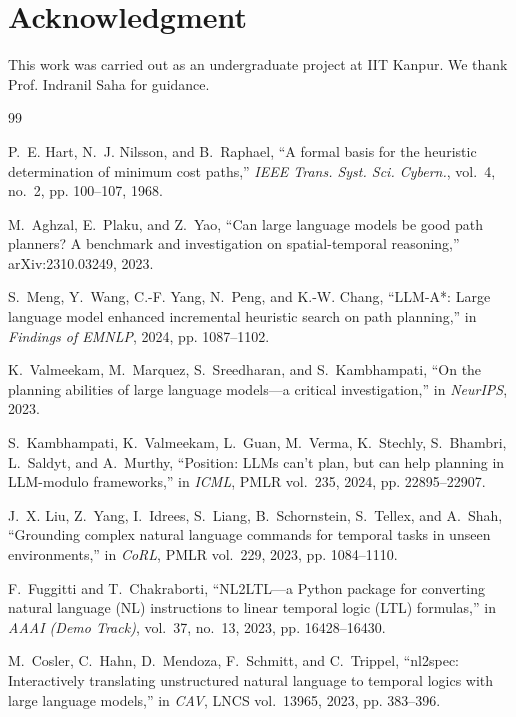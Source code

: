 \documentclass[letterpaper, 10 pt, conference]{ieeeconf}
\begin{document}
\section*{Acknowledgment}
This work was carried out as an undergraduate project at IIT Kanpur. We thank Prof. Indranil Saha for guidance.

\begin{thebibliography}{99}
\footnotesize

P.~E. Hart, N.~J. Nilsson, and B.~Raphael, ``A formal basis for the heuristic
determination of minimum cost paths,'' \emph{IEEE Trans. Syst. Sci. Cybern.}, vol.~4,
no.~2, pp. 100--107, 1968.

M.~Aghzal, E.~Plaku, and Z.~Yao, ``Can large language models be good path planners?
A benchmark and investigation on spatial-temporal reasoning,'' arXiv:2310.03249, 2023.

S.~Meng, Y.~Wang, C.-F. Yang, N.~Peng, and K.-W. Chang, ``LLM-A*: Large language model
enhanced incremental heuristic search on path planning,'' in \emph{Findings of EMNLP},
2024, pp. 1087--1102.

K.~Valmeekam, M.~Marquez, S.~Sreedharan, and S.~Kambhampati, ``On the planning
abilities of large language models---a critical investigation,'' in \emph{NeurIPS},
2023.

S.~Kambhampati, K.~Valmeekam, L.~Guan, M.~Verma, K.~Stechly, S.~Bhambri, L.~Saldyt,
and A.~Murthy, ``Position: LLMs can't plan, but can help planning in LLM-modulo
frameworks,'' in \emph{ICML}, PMLR vol.~235, 2024, pp. 22895--22907.

J.~X. Liu, Z.~Yang, I.~Idrees, S.~Liang, B.~Schornstein, S.~Tellex, and A.~Shah,
``Grounding complex natural language commands for temporal tasks in unseen
environments,'' in \emph{CoRL}, PMLR vol.~229, 2023, pp. 1084--1110.

F.~Fuggitti and T.~Chakraborti, ``NL2LTL---a Python package for converting natural
language (NL) instructions to linear temporal logic (LTL) formulas,'' in \emph{AAAI
(Demo Track)}, vol.~37, no.~13, 2023, pp. 16428--16430.

M.~Cosler, C.~Hahn, D.~Mendoza, F.~Schmitt, and C.~Trippel, ``nl2spec: Interactively
translating unstructured natural language to temporal logics with large language
models,'' in \emph{CAV}, LNCS vol.~13965, 2023, pp. 383--396.


\end{thebibliography}
\end{document}
